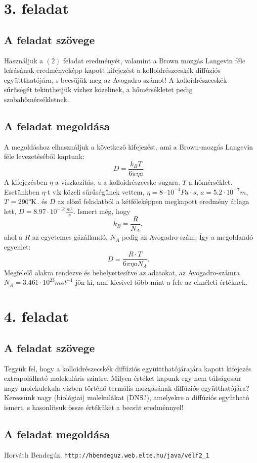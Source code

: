 \documentclass[12pt]{article}
\begin{document}
\section*{3. feladat} 
\subsection*{ A feladat szövege}
Használjuk a $(2)$ feladat eredményét, valamint a Brown mozgás Langevin féle leírásának eredményeképp
kapott kifejezést a kolloidrészecskék diffúziós együttthatójára, s becsüjük meg az Avogadro számot! A kolloidrészecskék sűrűségét tekinthetjük vízhez közelinek, a hőmérsékletet pedig szobahőmérsékletnek.

 
 \subsection*{A feladat megoldása}
 A megoldáshoz elhasználjuk a következő kifejezést, ami a Brown-mozgás Langevin féle levezetéséből kaptunk:
$$D = \frac{k_B T}{6\pi\eta a}$$
A kifejezésben $\eta$ a viszkozitás, $a$ a kolloidrészecske sugara, $T$ a hőmérséklet. Esetünkben $\eta$-t víz közeli sűrűségűnek vettem, $\eta = 8\cdot 10^{-4} Pa\cdot s$, $a = 5.2\cdot 10^{-7} m$, $T = 290 \text{\textdegree{K}}$. és $D$ az előző feladatból a kétféleképpen megkapott eredmény átlaga lett, $D = 8.97\cdot 10^{-13}\frac{m^2}{s}$. Ismert még, hogy $$k_B= \frac{R}{N_A},$$ ahol a $R$ az egyetemes gázállandó, $N_A$ pedig az Avogadro-szám. Így a megoldandó egyenlet:
$$ D = \frac{R\cdot T}{6\pi \eta a N_A} .$$
Megfelelő alakra rendezve és behelyettesítve az adatokat\cite{wik}, az Avogadro-számra $N_A = 3.461\cdot 10^{23} mol^{-1}$ jön ki, ami kicsivel több mint a fele az elméleti értéknek. 



\newpage
\section*{4. feladat}
\subsection*{ A feladat szövege}
Tegyük fel, hogy a kolloidrészecskék diffúziós együttthatójárajára kapott kifejezés extrapolálható molekuláris
szintre. Milyen értéket kapunk egy nem túlságosan nagy molekulekula vízben történő termális mozgásának diffúziós együtthatójára? Keressünk nagy (biológiai) molekulákat (DNS?), amelyekre a diffúziós együtható ismert, s hasonlítsuk össze értéküket a becsüt eredménnyel!

 
 \subsection*{A feladat megoldása}




\begin{thebibliography}{9}
Horváth Bendegúz, 
\texttt{http://hbendeguz.web.elte.hu/java/vélf2\_{}1}

\end{thebibliography}
\end{document}

